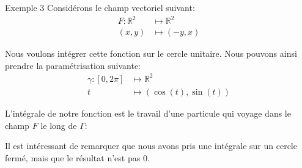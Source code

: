 \documentclass[a4paper]{article}
\begin{document}
\begin{parag}{Exemple 3}
    Considérons le champ vectoriel suivant:
    \[\begin{split}
    F: \mathbb{R}^2 &\longmapsto \mathbb{R}^2 \\
    \left(x, y\right) &\longmapsto \left(-y, x\right)
    \end{split}\]
    
    Nous voulons intégrer cette fonction sur le cercle unitaire. Nous pouvons ainsi prendre la paramétrisation suivante:
    \[\begin{split}
    \gamma: \left[0, 2\pi\right] &\longmapsto \mathbb{R}^2 \\
    t &\longmapsto \left(\cos\left(t\right), \sin\left(t\right)\right)
    \end{split}\]
    
    L'intégrale de notre fonction est le travail d'une particule qui voyage dans le champ $F$ le long de $\Gamma$: 

    Il est intéressant de remarquer que nous avons pris une intégrale sur un cercle fermé, mais que le résultat n'est pas 0.
\end{parag}
\end{document}
